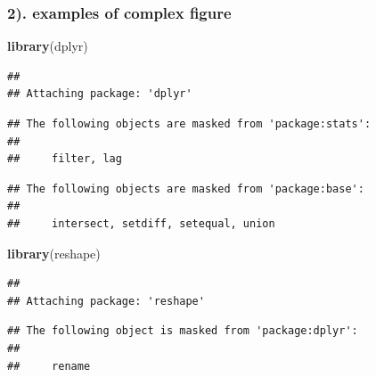 \documentclass[
]{article}
\newenvironment{Shaded}{\begin{snugshade}}{\end{snugshade}}
\newcommand{\CommentTok}[1]{\textcolor[rgb]{0.56,0.35,0.01}{\textit{#1}}}
\newcommand{\DataTypeTok}[1]{\textcolor[rgb]{0.13,0.29,0.53}{#1}}
\newcommand{\KeywordTok}[1]{\textcolor[rgb]{0.13,0.29,0.53}{\textbf{#1}}}
\newcommand{\NormalTok}[1]{#1}
\newcommand{\OperatorTok}[1]{\textcolor[rgb]{0.81,0.36,0.00}{\textbf{#1}}}
\newcommand{\StringTok}[1]{\textcolor[rgb]{0.31,0.60,0.02}{#1}}
\begin{document}
\hypertarget{examples-of-complex-figure}{%
\subsubsection{2). examples of complex
figure}\label{examples-of-complex-figure}}

\begin{Shaded}
\begin{Highlighting}[]
\KeywordTok{library}\NormalTok{(dplyr)}
\end{Highlighting}
\end{Shaded}

\begin{verbatim}
## 
## Attaching package: 'dplyr'
\end{verbatim}

\begin{verbatim}
## The following objects are masked from 'package:stats':
## 
##     filter, lag
\end{verbatim}

\begin{verbatim}
## The following objects are masked from 'package:base':
## 
##     intersect, setdiff, setequal, union
\end{verbatim}

\begin{Shaded}
\begin{Highlighting}[]
\KeywordTok{library}\NormalTok{(reshape)}
\end{Highlighting}
\end{Shaded}

\begin{verbatim}
## 
## Attaching package: 'reshape'
\end{verbatim}

\begin{verbatim}
## The following object is masked from 'package:dplyr':
## 
##     rename
\end{verbatim}

\begin{Shaded}
\end{Shaded}
\end{document}
